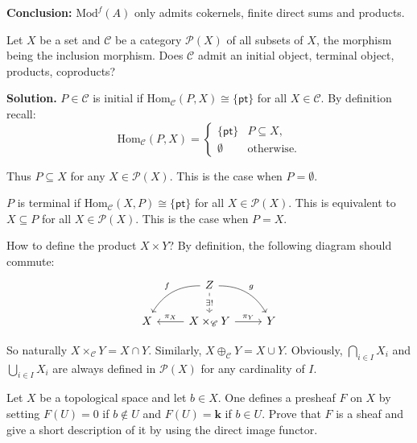 \documentclass{category-template}
\begin{document}
\textbf{Conclusion:} $\text{Mod}^f(A)$ only admits cokernels, finite direct sums
and products.

\begin{problem}
    Let $X$ be a set and $\mathcal{C}$ be a category $\mathcal{P}(X)$ of all
    subsets of $X$, the morphism being the inclusion morphism. Does
    $\mathcal{C}$ admit an initial object, terminal object, products,
    coproducts?
\end{problem}

\textbf{Solution.} $P \in \mathcal{C}$ is initial if
$\text{Hom}_{\mathcal{C}}(P,X) \cong \{\mathsf{pt}\}$ for all $X \in
\mathcal{C}$. By definition recall:
\begin{equation*}
    \text{Hom}_{\mathcal{C}}(P,X) = \begin{cases}
        \{\mathsf{pt}\} & P \subseteq X, \\
        \emptyset & \text{otherwise}.
    \end{cases}
\end{equation*}

Thus $P \subseteq X$ for any $X \in \mathcal{P}(X)$. This is the case when
$P=\emptyset$.

$P$ is terminal if $\text{Hom}_{\mathcal{C}}(X,P) \cong \{\mathsf{pt}\}$ for all
$X \in \mathcal{P}(X)$. This is equivalent to $X \subseteq P$ for all $X \in
\mathcal{P}(X)$. This is the case when $P=X$.

How to define the product $X \times Y$? By definition, the following diagram
should commute:
\[
\begin{tikzcd}
& Z \arrow[dashed]{d}[description]{\exists!} \arrow[bend left]{dr}{g} \arrow[bend right]{dl}[swap]{f} & \\
X & X \times_{\mathcal{C}} Y \arrow{l}[swap]{\pi_X} \arrow{r}{\pi_Y} & Y
\end{tikzcd}
\]

So naturally $X \times_{\mathcal{C}} Y = X \cap Y$. Similarly, $X
\oplus_{\mathcal{C}} Y = X \cup Y$. Obviously, $\bigcap_{i \in I} X_i$ and
$\bigcup_{i\in I} X_i$ are always defined in $\mathcal{P}(X)$ for any
cardinality of $I$.

\begin{problem}
    Let $X$ be a topological space and let $b \in X$. One defines a presheaf $F$
    on $X$ by setting $F(U)=0$ if $b \not\in U$ and $F(U) = \mathbf{k}$ if $b
    \in U$. Prove that $F$ is a sheaf and give a short description of it by
    using the direct image functor.
\end{problem}
\end{document}
